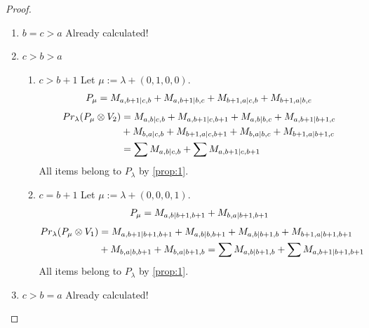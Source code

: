 \documentclass[12pt,a4paper]{article}
\begin{document}
\begin{proof}
\begin{enumerate}
\item $b=c>a$ Already calculated! 

\item $c>b>a$
  \begin{enumerate}
    \item $c>b+1$
        Let $\mu:=\lambda + (0,1,0,0) $. 
\begin{equation}\notag
  \begin{aligned}
      P_{\mu} =
M_{a,b+1|c,b}
+M_{a,b+1|b,c}
+M_{b+1,a|c,b}
+M_{b+1,a|b,c}
  \end{aligned}
\end{equation}
\begin{equation}\notag
  \begin{aligned}
    Pr_{\lambda}(P_\mu \otimes V_2) &=
M_{a,b|c,b}
+M_{a,b+1|c,b+1}
+M_{a,b|b,c}
+M_{a,b+1|b+1,c} \\
                                    &+
M_{b,a|c,b}
+M_{b+1,a|c,b+1}
+M_{b,a|b,c}
+M_{b+1,a|b+1,c}\\
                                    &=
\sum M_{a,b|c,b}
+\sum M_{a,b+1|c,b+1}
  \end{aligned}
\end{equation}
All items belong to $P_\lambda$ by \cref{prop:1}.

\item $c=b+1$
        Let $\mu:=\lambda + (0,0,0,1) $. 
\begin{equation}\notag
  \begin{aligned}
      P_{\mu} =
M_{a,b|b+1,b+1}
+M_{b,a|b+1,b+1}
  \end{aligned}
\end{equation}
\begin{equation}\notag
  \begin{aligned}
    Pr_{\lambda}(P_\mu \otimes V_1) &=
M_{a,b+1|b+1,b+1}
+M_{a,b|b,b+1}
+M_{a,b|b+1,b}
    +M_{b+1,a|b+1,b+1} \\
                                    &+
M_{b,a|b,b+1}
+M_{b,a|b+1,b}
=\sum M_{a,b|b+1,b}
+\sum M_{a,b+1|b+1,b+1}
  \end{aligned}
\end{equation}
All items belong to $P_\lambda$ by \cref{prop:1}.

  \end{enumerate}

\item $c>b=a$ Already calculated! 

\end{enumerate}
\end{proof}
\end{document}
